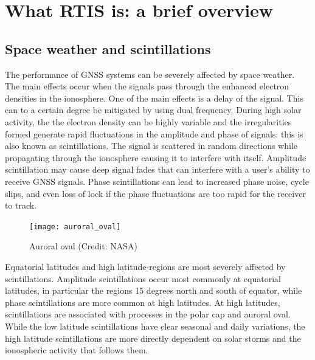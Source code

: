 \documentclass{themeensg}
\begin{document}


\section{What RTIS is: a brief overview}

\subsection{Space weather and scintillations}

The performance of GNSS systems can be severely affected by space weather. The main effects occur when the signals pass through the enhanced electron densities in the ionosphere. One of the main effects is a delay of the signal. This can to a certain degree be mitigated by using dual frequency. During high solar activity, the the electron density can be highly variable and the irregularities formed generate rapid fluctuations in the amplitude and phase of signals: this is also known as scintillations. The signal is scattered in random directions while propagating through the ionosphere causing it to interfere with itself. Amplitude scintillation may cause deep signal fades that can interfere with a user’s ability to receive GNSS signals. Phase scintillations can lead to increased phase noise, cycle slips, and even loss of lock if the phase fluctuations are too rapid for the receiver to track.\

\begin{figure}[hb]
	\centering
	\texttt{[image: auroral\_oval]}
	\caption{Auroral oval (Credit: NASA)}
\end{figure}

Equatorial latitudes and high latitude-regions are most severely affected by scintillations. Amplitude scintillations occur most commonly at equatorial latitudes, in particular the regions 15 degrees north and south of equator, while phase scintillations are more common at high latitudes. At high latitudes, scintillations are associated with processes in the polar cap and auroral oval. While the low latitude scintillations have clear seasonal and daily variations, the high latitude scintillations are more directly dependent on solar storms and the ionospheric activity that follows them.\\
\end{document}
